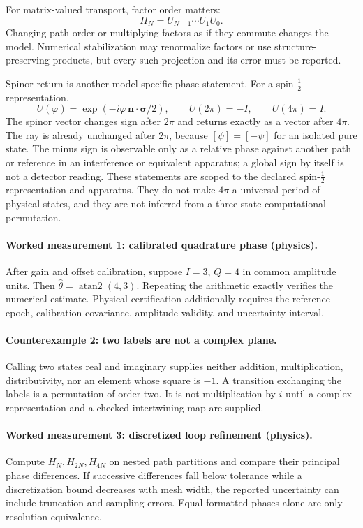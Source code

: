 For matrix-valued transport, factor order matters:
\[
                         H_N=U_{N-1}\cdots U_1U_0.
\]
Changing path order or multiplying factors as if they commute changes the model.  Numerical stabilization may
renormalize factors or use structure-preserving products, but every such projection and its error must be reported.

Spinor return is another model-specific phase statement.  For a spin-\(\tfrac12\) representation,
\[
                         U(\varphi)=\exp(-i\varphi\,\mathbf n\cdot\boldsymbol\sigma/2),
\qquad U(2\pi)=-I,\qquad U(4\pi)=I.
\]
The spinor vector changes sign after \(2\pi\) and returns exactly as a vector after \(4\pi\).  The ray is already
unchanged after \(2\pi\), because \([\psi]=[-\psi]\) for an isolated pure state.  The minus sign is observable only
as a relative phase against another path or reference in an interference or equivalent apparatus; a global sign by
itself is not a detector reading.  These statements are scoped to the declared spin-\(\tfrac12\) representation and
apparatus.  They do not make \(4\pi\) a universal period of physical states, and they are not inferred from a
three-state computational permutation.

\paragraph{Worked measurement 1: calibrated quadrature phase (physics).}
After gain and offset calibration, suppose \(I=3\), \(Q=4\) in common amplitude units.  Then
\(\widehat\theta=\operatorname{atan2}(4,3)\).  Repeating the arithmetic exactly verifies the numerical estimate.
Physical certification additionally requires the reference epoch, calibration covariance, amplitude validity, and
uncertainty interval.

\paragraph{Counterexample 2: two labels are not a complex plane.}
Calling two states real and imaginary supplies neither addition, multiplication, distributivity, nor an element whose
square is \(-1\).  A transition exchanging the labels is a permutation of order two.  It is not multiplication by
\(i\) until a complex representation and a checked intertwining map are supplied.

\paragraph{Worked measurement 3: discretized loop refinement (physics).}
Compute \(H_N,H_{2N},H_{4N}\) on nested path partitions and compare their principal phase differences.  If successive
differences fall below tolerance while a discretization bound decreases with mesh width, the reported uncertainty
can include truncation and sampling errors.  Equal formatted phases alone are only resolution equivalence.

